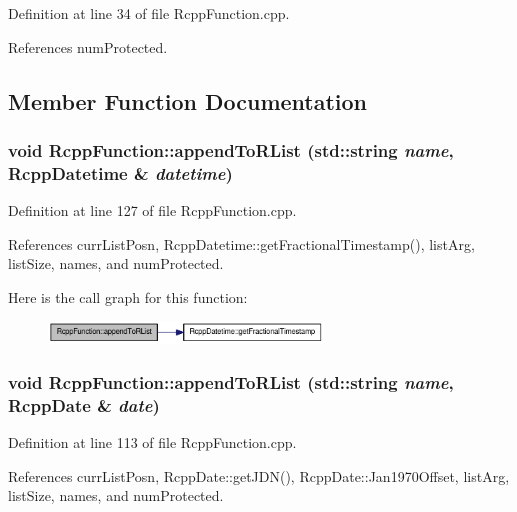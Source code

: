 Definition at line 34 of file RcppFunction.cpp.

References numProtected.

\subsection{Member Function Documentation}
\hypertarget{classRcppFunction_a0be4ab064287c2d3a5c3b883a1707d70}{
\subsubsection[{appendToRList}]{\setlength{\rightskip}{0pt plus 5cm}void RcppFunction::appendToRList (std::string {\em name}, \/  {\bf RcppDatetime} \& {\em datetime})}}
\label{classRcppFunction_a0be4ab064287c2d3a5c3b883a1707d70}


Definition at line 127 of file RcppFunction.cpp.

References currListPosn, RcppDatetime::getFractionalTimestamp(), listArg, listSize, names, and numProtected.

Here is the call graph for this function:\nopagebreak
\begin{figure}[H]
\begin{center}
\leavevmode
\includegraphics[width=207pt]{classRcppFunction_a0be4ab064287c2d3a5c3b883a1707d70_cgraph}
\end{center}
\end{figure}
\hypertarget{classRcppFunction_a9aab0b3accb81d90fb813acf3bf4c49d}{
\subsubsection[{appendToRList}]{\setlength{\rightskip}{0pt plus 5cm}void RcppFunction::appendToRList (std::string {\em name}, \/  {\bf RcppDate} \& {\em date})}}
\label{classRcppFunction_a9aab0b3accb81d90fb813acf3bf4c49d}


Definition at line 113 of file RcppFunction.cpp.

References currListPosn, RcppDate::getJDN(), RcppDate::Jan1970Offset, listArg, listSize, names, and numProtected.

